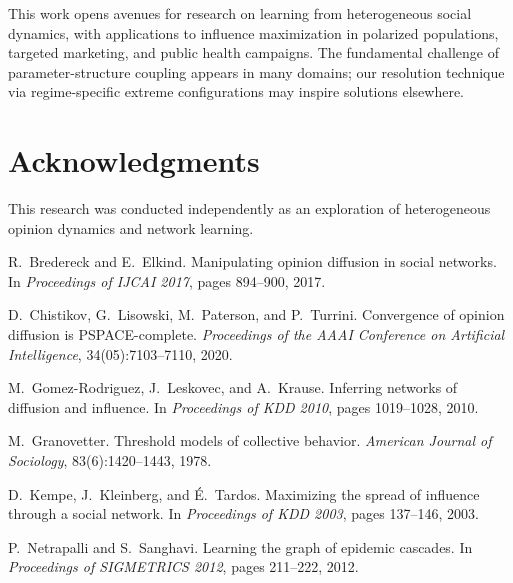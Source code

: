 \documentclass[conference]{IEEEtran}
\begin{document}
This work opens avenues for research on learning from heterogeneous social dynamics, with applications to influence maximization in polarized populations, targeted marketing, and public health campaigns. The fundamental challenge of parameter-structure coupling appears in many domains; our resolution technique via regime-specific extreme configurations may inspire solutions elsewhere.

\section*{Acknowledgments}

This research was conducted independently as an exploration of heterogeneous opinion dynamics and network learning.

\begin{thebibliography}{10}

R.~Bredereck and E.~Elkind.
\newblock Manipulating opinion diffusion in social networks.
\newblock In \emph{Proceedings of IJCAI 2017}, pages 894--900, 2017.

D.~Chistikov, G.~Lisowski, M.~Paterson, and P.~Turrini.
\newblock Convergence of opinion diffusion is {PSPACE}-complete.
\newblock \emph{Proceedings of the AAAI Conference on Artificial Intelligence}, 34(05):7103--7110, 2020.

M.~Gomez-Rodriguez, J.~Leskovec, and A.~Krause.
\newblock Inferring networks of diffusion and influence.
\newblock In \emph{Proceedings of KDD 2010}, pages 1019--1028, 2010.

M.~Granovetter.
\newblock Threshold models of collective behavior.
\newblock \emph{American Journal of Sociology}, 83(6):1420--1443, 1978.

D.~Kempe, J.~Kleinberg, and \'E.~Tardos.
\newblock Maximizing the spread of influence through a social network.
\newblock In \emph{Proceedings of KDD 2003}, pages 137--146, 2003.

P.~Netrapalli and S.~Sanghavi.
\newblock Learning the graph of epidemic cascades.
\newblock In \emph{Proceedings of SIGMETRICS 2012}, pages 211--222, 2012.

\end{thebibliography}
\end{document}
